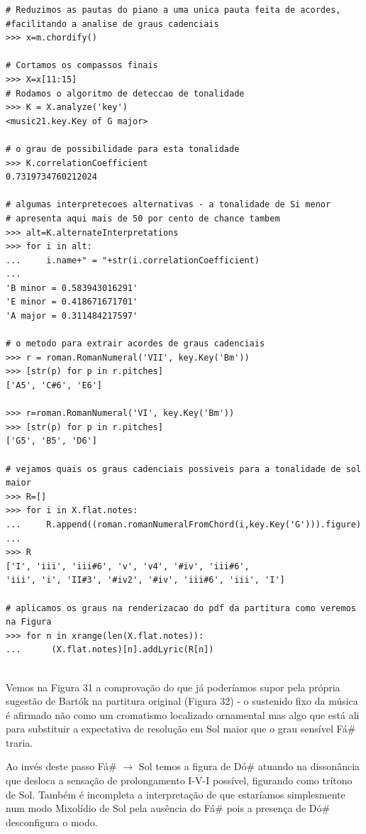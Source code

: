 \documentclass[
	12pt,				%
	openright,			%
	twoside,			%
	a4paper,			%
	english,			%
	french,				%
	spanish,			%
	brazil				%
	]{abntex2}
\begin{document}
\begin{lstlisting}
# Reduzimos as pautas do piano a uma unica pauta feita de acordes,
#facilitando a analise de graus cadenciais
>>> x=m.chordify()

# Cortamos os compassos finais
>>> X=x[11:15]
# Rodamos o algoritmo de deteccao de tonalidade
>>> K = X.analyze('key')
<music21.key.Key of G major>

# o grau de possibilidade para esta tonalidade
>>> K.correlationCoefficient
0.7319734760212024

# algumas interpretecoes alternativas - a tonalidade de Si menor
# apresenta aqui mais de 50 por cento de chance tambem
>>> alt=K.alternateInterpretations
>>> for i in alt:
...     i.name+" = "+str(i.correlationCoefficient)      
... 
'B minor = 0.583943016291'
'E minor = 0.418671671701'
'A major = 0.311484217597'

# o metodo para extrair acordes de graus cadenciais
>>> r = roman.RomanNumeral('VII', key.Key('Bm'))
>>> [str(p) for p in r.pitches]
['A5', 'C#6', 'E6']

>>> r=roman.RomanNumeral('VI', key.Key('Bm'))
>>> [str(p) for p in r.pitches]
['G5', 'B5', 'D6']

# vejamos quais os graus cadenciais possiveis para a tonalidade de sol maior
>>> R=[]
>>> for i in X.flat.notes:
...     R.append((roman.romanNumeralFromChord(i,key.Key('G'))).figure)
... 
>>> R
['I', 'iii', 'iii#6', 'v', 'v4', '#iv', 'iii#6', 
'iii', 'i', 'II#3', '#iv2', '#iv', 'iii#6', 'iii', 'I']

# aplicamos os graus na renderizacao do pdf da partitura como veremos na Figura
>>> for n in xrange(len(X.flat.notes)):
...      (X.flat.notes)[n].addLyric(R[n])


\end{lstlisting}

Vemos na Figura 31 a comprovação do que já poderíamos supor pela própria sugestão de Bartók na partitura original (Figura 32) - o sustenido fixo da música é afirmado não como um cromatismo localizado ornamental mas algo que está ali para substituir a expectativa de resolução em Sol maior que o grau sensível Fá\# traria. 

Ao invés deste passo Fá\# $ \rightarrow $ Sol temos a figura de Dó\# atuando na dissonância que desloca a sensação de prolongamento I-V-I possível, figurando como trítono de Sol. Também é incompleta a interpretação de que estaríamos simplesmente num modo Mixolídio de Sol pela ausência do Fá\# pois a presença de Dó\# desconfigura o modo.
\end{document}

